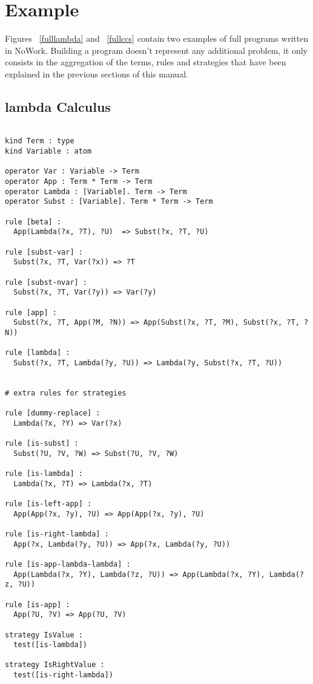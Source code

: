 \documentclass[12pt,a4paper]{article}
\begin{document}
\section{Example}
Figures ~\ref{fulllambda} and ~\ref{fullccs} contain two examples of
full programs written in NoWork. Building a program doesn't represent
any additional problem, it only consists in the aggregation of the terms, rules and
strategies that have been explained in the previous sections of this
manual.


\subsection{lambda Calculus}

\begin{verbatim}
  
kind Term : type
kind Variable : atom

operator Var : Variable -> Term
operator App : Term * Term -> Term
operator Lambda : [Variable]. Term -> Term
operator Subst : [Variable]. Term * Term -> Term

rule [beta] :
  App(Lambda(?x, ?T), ?U)  => Subst(?x, ?T, ?U)

rule [subst-var] :
  Subst(?x, ?T, Var(?x)) => ?T

rule [subst-nvar] :
  Subst(?x, ?T, Var(?y)) => Var(?y)

rule [app] :
  Subst(?x, ?T, App(?M, ?N)) => App(Subst(?x, ?T, ?M), Subst(?x, ?T, ?N))

rule [lambda] :
  Subst(?x, ?T, Lambda(?y, ?U)) => Lambda(?y, Subst(?x, ?T, ?U))


# extra rules for strategies

rule [dummy-replace] :
  Lambda(?x, ?Y) => Var(?x)

rule [is-subst] :
  Subst(?U, ?V, ?W) => Subst(?U, ?V, ?W)

rule [is-lambda] :
  Lambda(?x, ?T) => Lambda(?x, ?T)

rule [is-left-app] : 
  App(App(?x, ?y), ?U) => App(App(?x, ?y), ?U)

rule [is-right-lambda] :
  App(?x, Lambda(?y, ?U)) => App(?x, Lambda(?y, ?U))

rule [is-app-lambda-lambda] :
  App(Lambda(?x, ?Y), Lambda(?z, ?U)) => App(Lambda(?x, ?Y), Lambda(?z, ?U))

rule [is-app] :
  App(?U, ?V) => App(?U, ?V)

strategy IsValue :
  test([is-lambda])

strategy IsRightValue :
  test([is-right-lambda])


\end{verbatim}
\end{document}

